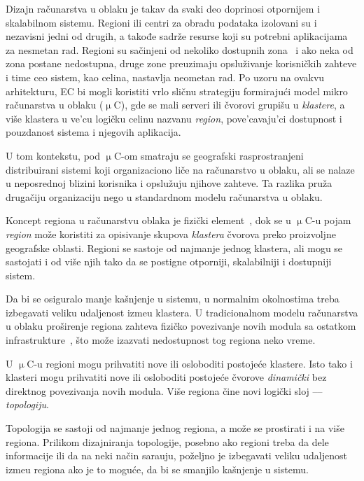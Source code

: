 Dizajn ra\v cunarstva u oblaku je takav da svaki deo doprinosi otpornijem i skalabilnom sistemu. Regioni ili centri za obradu podataka izolovani su i nezavisni jedni od drugih, a takođe sadr\v ze resurse koji su potrebni aplikacijama za nesmetan rad. Regioni su sa\v cinjeni od nekoliko dostupnih zona~\cite{SouzaMFAK19} i ako neka od zona postane nedostupna, druge zone preuzimaju opslu\v zivanje korisni\v ckih zahteve i time ceo sistem, kao celina, nastavlja neometan rad. Po uzoru na ovakvu arhitekturu, EC bi mogli koristiti vrlo sli\v cnu strategiju formiraju\'ci model mikro ra\v cunarstva u oblaku ($\upmu$C), gde se mali serveri ili \v cvorovi grupi\v su u \emph{klastere}, a vi\v se klastera u ve'cu logi\v cku celinu nazvanu \emph{region}, pove'cavaju'ci dostupnost i pouzdanost sistema i njegovih aplikacija.

U tom kontekstu, pod $\upmu$C-om smatraju se geografski rasprostranjeni distribuirani sistemi koji organizaciono li\v ce na ra\v cunarstvo u oblaku, ali se nalaze u neposrednoj blizini korisnika i opslu\v zuju njihove zahteve. Ta razlika pru\v za druga\v ciju organizaciju nego u standardnom modelu ra\v cunarstva u oblaku. 

Koncept regiona u ra\v cunarstvu oblaka je fizi\v cki element~\cite{SouzaMFAK19}, dok se u $\upmu$C-u pojam \emph{region} mo\v ze koristiti za opisivanje skupova \emph{klastera} \v cvorova preko proizvoljne geografske oblasti. Regioni se sastoje od najmanje jednog klastera, ali mogu se sastojati i od vi\v se njih tako da se postigne otporniji, skalabilniji i dostupniji sistem. 

Da bi se osiguralo manje ka\v snjenje u sistemu, u normalnim okolnostima treba izbegavati veliku udaljenost izme\dj u klastera. U tradicionalnom modelu ra\v cunarstva u oblaku pro\v sirenje regiona zahteva fizi\v cko povezivanje novih modula sa ostatkom infrastrukture~\cite{Hamilton07}, \v sto mo\v ze izazvati nedostupnost tog regiona neko vreme.
 
U $\upmu$C-u regioni mogu prihvatiti nove ili osloboditi postoje\'ce klastere. Isto tako i klasteri mogu prihvatiti nove ili osloboditi postoje\'ce \v cvorove \emph{dinami\v cki} bez direktnog povezivanja novih modula. Vi\v se regiona \v cine novi logički sloj --– \emph{topologiju}. 

Topologija se sastoji od najmanje jednog regiona, a mo\v ze se prostirati i na vi\v se regiona. Prilikom dizajniranja topologije, posebno ako regioni treba da dele informacije ili da na neki na\v cin sara\dj uju, po\v zeljno je izbegavati veliku udaljenost izme\dj u regiona ako je to mogu\'ce, da bi se smanjilo ka\v snjenje u sistemu. 

